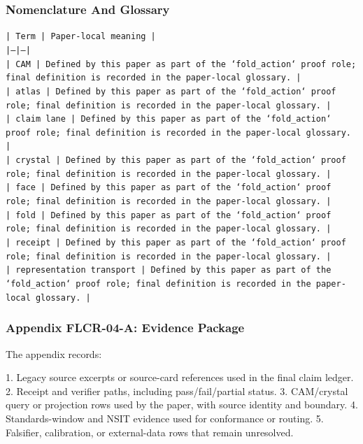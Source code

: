 \documentclass[11pt]{article}
\begin{document}
\subsubsection*{Nomenclature And Glossary}

\noindent\texttt{| Term | Paper-local meaning |}\\
\noindent\texttt{|---|---|}\\
\noindent\texttt{| CAM | Defined by this paper as part of the `fold\_action` proof role; final definition is recorded in the paper-local glossary. |}\\
\noindent\texttt{| atlas | Defined by this paper as part of the `fold\_action` proof role; final definition is recorded in the paper-local glossary. |}\\
\noindent\texttt{| claim lane | Defined by this paper as part of the `fold\_action` proof role; final definition is recorded in the paper-local glossary. |}\\
\noindent\texttt{| crystal | Defined by this paper as part of the `fold\_action` proof role; final definition is recorded in the paper-local glossary. |}\\
\noindent\texttt{| face | Defined by this paper as part of the `fold\_action` proof role; final definition is recorded in the paper-local glossary. |}\\
\noindent\texttt{| fold | Defined by this paper as part of the `fold\_action` proof role; final definition is recorded in the paper-local glossary. |}\\
\noindent\texttt{| receipt | Defined by this paper as part of the `fold\_action` proof role; final definition is recorded in the paper-local glossary. |}\\
\noindent\texttt{| representation transport | Defined by this paper as part of the `fold\_action` proof role; final definition is recorded in the paper-local glossary. |}\\

\subsubsection*{Appendix FLCR-04-A: Evidence Package}

The appendix records:

1. Legacy source excerpts or source-card references used in the final claim ledger.
2. Receipt and verifier paths, including pass/fail/partial status.
3. CAM/crystal query or projection rows used by the paper, with source identity and boundary.
4. Standards-window and NSIT evidence used for conformance or routing.
5. Falsifier, calibration, or external-data rows that remain unresolved.
\end{document}
